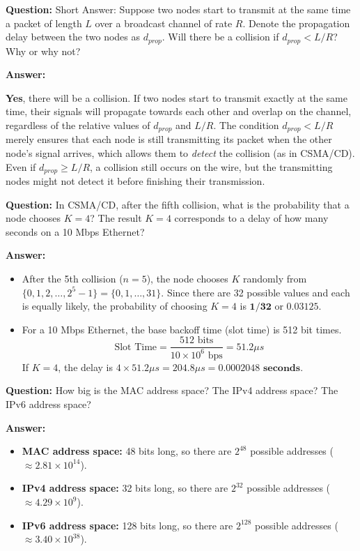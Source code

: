 \documentclass[12pt, letterpaper]{article}
\newcommand{\question}[1]{\noindent\textbf{Question: }#1\par\vspace{0.5em}}
\newcommand{\answer}{\noindent\textbf{Answer:}\par\vspace{0.5em}}
\begin{document}
\question{Short Answer: Suppose two nodes start to transmit at the same time a packet of length $L$ over a broadcast channel of rate $R$. Denote the propagation delay between the two nodes as $d_{prop}$. Will there be a collision if $d_{prop} < L/R$? Why or why not?}

\answer
\textbf{Yes}, there will be a collision. If two nodes start to transmit exactly at the same time, their signals will propagate towards each other and overlap on the channel, regardless of the relative values of $d_{prop}$ and $L/R$. The condition $d_{prop} < L/R$ merely ensures that each node is still transmitting its packet when the other node's signal arrives, which allows them to \textit{detect} the collision (as in CSMA/CD). Even if $d_{prop} \geq L/R$, a collision still occurs on the wire, but the transmitting nodes might not detect it before finishing their transmission.

\question{In CSMA/CD, after the fifth collision, what is the probability that a node chooses $K=4$? The result $K=4$ corresponds to a delay of how many seconds on a 10 Mbps Ethernet?}

\answer
\begin{itemize}
    \item After the 5th collision ($n=5$), the node chooses $K$ randomly from $\{0, 1, 2, \dots, 2^5-1\} = \{0, 1, \dots, 31\}$. Since there are 32 possible values and each is equally likely, the probability of choosing $K=4$ is $\mathbf{1/32}$ or $\mathbf{0.03125}$.
    \item For a 10 Mbps Ethernet, the base backoff time (slot time) is 512 bit times. 
    \begin{equation*}
    \text{Slot Time} = \frac{512 \text{ bits}}{10 \times 10^6 \text{ bps}} = 51.2 \mu s
    \end{equation*}
    If $K=4$, the delay is $4 \times 51.2 \mu s = 204.8 \mu s = \mathbf{0.0002048 \text{ seconds}}$.
\end{itemize}

\question{How big is the MAC address space? The IPv4 address space? The IPv6 address space?}

\answer
\begin{itemize}
    \item \textbf{MAC address space:} 48 bits long, so there are $2^{48}$ possible addresses ($\approx 2.81 \times 10^{14}$).
    \item \textbf{IPv4 address space:} 32 bits long, so there are $2^{32}$ possible addresses ($\approx 4.29 \times 10^9$).
    \item \textbf{IPv6 address space:} 128 bits long, so there are $2^{128}$ possible addresses ($\approx 3.40 \times 10^{38}$).
\end{itemize}
\end{document}
